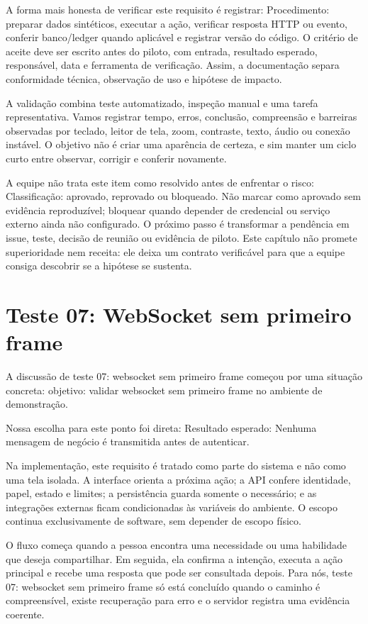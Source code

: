 \documentclass[12pt,oneside,a4paper,article]{abntex2}
\begin{document}
A forma mais honesta de verificar este requisito é registrar: Procedimento: preparar dados sintéticos, executar a ação, verificar resposta HTTP ou evento, conferir banco/ledger quando aplicável e registrar versão do código. O critério de aceite deve ser escrito antes do piloto, com entrada, resultado esperado, responsável, data e ferramenta de verificação. Assim, a documentação separa conformidade técnica, observação de uso e hipótese de impacto.

A validação combina teste automatizado, inspeção manual e uma tarefa representativa. Vamos registrar tempo, erros, conclusão, compreensão e barreiras observadas por teclado, leitor de tela, zoom, contraste, texto, áudio ou conexão instável. O objetivo não é criar uma aparência de certeza, e sim manter um ciclo curto entre observar, corrigir e conferir novamente.

A equipe não trata este item como resolvido antes de enfrentar o risco: Classificação: aprovado, reprovado ou bloqueado. Não marcar como aprovado sem evidência reproduzível; bloquear quando depender de credencial ou serviço externo ainda não configurado. O próximo passo é transformar a pendência em issue, teste, decisão de reunião ou evidência de piloto. Este capítulo não promete superioridade nem receita: ele deixa um contrato verificável para que a equipe consiga descobrir se a hipótese se sustenta.

\section{Teste 07: WebSocket sem primeiro frame}
A discussão de teste 07: websocket sem primeiro frame começou por uma situação concreta: objetivo: validar websocket sem primeiro frame no ambiente de demonstração.

Nossa escolha para este ponto foi direta: Resultado esperado: Nenhuma mensagem de negócio é transmitida antes de autenticar.

Na implementação, este requisito é tratado como parte do sistema e não como uma tela isolada. A interface orienta a próxima ação; a API confere identidade, papel, estado e limites; a persistência guarda somente o necessário; e as integrações externas ficam condicionadas às variáveis do ambiente. O escopo continua exclusivamente de software, sem depender de escopo físico.

O fluxo começa quando a pessoa encontra uma necessidade ou uma habilidade que deseja compartilhar. Em seguida, ela confirma a intenção, executa a ação principal e recebe uma resposta que pode ser consultada depois. Para nós, teste 07: websocket sem primeiro frame só está concluído quando o caminho é compreensível, existe recuperação para erro e o servidor registra uma evidência coerente.
\end{document}

